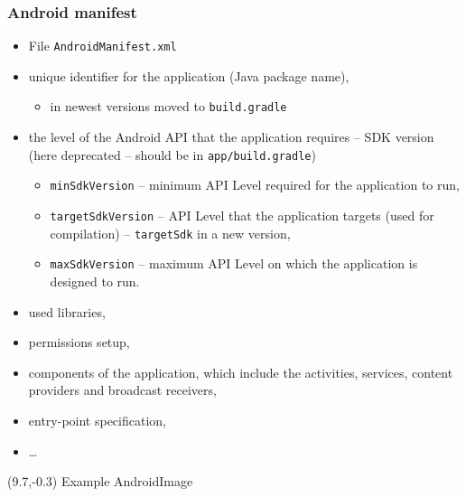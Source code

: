 \documentclass[10pt,xcolor=pdflatex]{beamer}
\begin{document}
\begin{frame}\frametitle{Android manifest}
	\begin{itemize}
		\item File \texttt{AndroidManifest.xml}
        \item unique identifier for the application (Java package name),
          \begin{itemize}
              \item in newest versions moved to \texttt{build.gradle}
          \end{itemize}
        \item the level of the Android API that the application requires -- SDK version (here deprecated -- should be in \texttt{app/build.gradle})
          \begin{itemize}
            \item \texttt{minSdkVersion} -- minimum API Level required for the application to run,
            \item \texttt{targetSdkVersion} -- API Level that the application targets (used for compilation) -- \texttt{targetSdk} in a new version,
            \item \texttt{maxSdkVersion} -- maximum API Level on which the application is designed to run.
          \end{itemize}
        \item used libraries,
		\item permissions setup,
		\item components of the application, which include the activities, services, content providers and broadcast receivers,
        \item entry-point specification,
        \item \ldots
	\end{itemize}
\begin{textblock}{15}(9.7,-0.3)
    {\footnotesize Example AndroidImage}
\end{textblock}
\end{frame}
\end{document}
